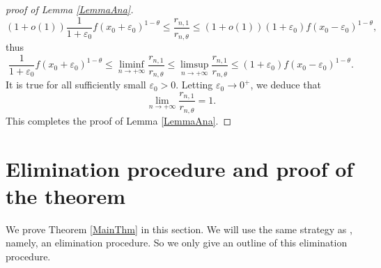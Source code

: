 \documentclass[11pt]{amsart}
\numberwithin{equation}{section}
\begin{document}
\begin{proof}[proof of Lemma \ref{LemmaAna}]
\[\left( 1+o(1) \right)\frac{1}{1+\varepsilon_0} f(x_0 + \varepsilon_0)^{1 - \theta} \leqslant \frac{r_{n,1}}{r_{n,\theta}} \leqslant \left( 1+o(1) \right)(1+\varepsilon_0)f(x_0 - \varepsilon_0)^{1-\theta},\]
thus
\[\frac{1}{1+\varepsilon_0} f(x_0 + \varepsilon_0)^{1 - \theta} \leqslant \liminf_{n \rightarrow +\infty} \frac{r_{n,1}}{r_{n,\theta}} \leqslant \limsup_{n \rightarrow +\infty} \frac{r_{n,1}}{r_{n,\theta}} \leqslant  (1+\varepsilon_0) f(x_0 - \varepsilon_0)^{1-\theta}.\]
It is true for all sufficiently small $\varepsilon_0>0$. Letting $\varepsilon_0 \rightarrow 0^+$, we deduce that
\[\lim_{n \rightarrow +\infty} \frac{r_{n,1}}{r_{n,\theta}} = 1.\]
This completes the proof of Lemma \ref{LemmaAna}.
\end{proof}
\bigskip

\section{Elimination procedure and proof of the theorem}
\label{Elimination_procedure}

We prove Theorem \ref{MainThm} in this section. We will use the same strategy as \cite[\S 5]{FSZ2019}, namely, an elimination procedure. So we only give an outline of this elimination procedure.
\end{document}
